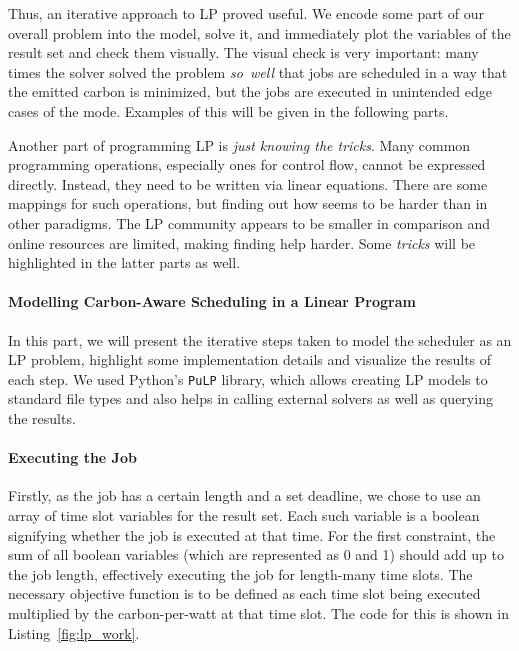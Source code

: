 Thus, an iterative approach to LP proved useful. 
We encode some part of our overall problem into the model, solve it, and immediately plot the variables of the result set and check them visually.
The visual check is very important: many times the solver solved the problem \emph{so~well} that jobs are scheduled in a way that the emitted carbon is minimized, but the jobs are executed in unintended edge cases of the mode.
Examples of this will be given in the following parts.

Another part of programming LP is \emph{just knowing the tricks}. 
Many common programming operations, especially ones for control flow, cannot be expressed directly.
Instead, they need to be written via linear equations.
There are some mappings for such operations, but finding out how seems to be harder than in other paradigms.
The LP community appears to be smaller in comparison and online resources are limited, making finding help harder.
Some \emph{tricks} will be highlighted in the latter parts as well. 

\paragraph{Modelling Carbon-Aware Scheduling in a Linear Program}

In this part, we will present the iterative steps taken to model the scheduler as an LP problem, highlight some implementation details and visualize the results of each step.
We used Python's \verb|PuLP| library, which allows creating LP models to standard file types and also helps in calling external solvers as well as querying the results.

\paragraph{Executing the Job}

Firstly, as the job has a certain length and a set deadline, we chose to use an array of time slot variables for the result set. Each such variable is a boolean signifying whether the job is executed at that time.
For the first constraint, the sum of all boolean variables (which are represented as 0 and 1) should add up to the job length, effectively executing the job for length-many time slots.
The necessary objective function is to be defined as each time slot being executed multiplied by the carbon-per-watt at that time slot.
The code for this is shown in Listing~\ref{fig:lp_work}.

